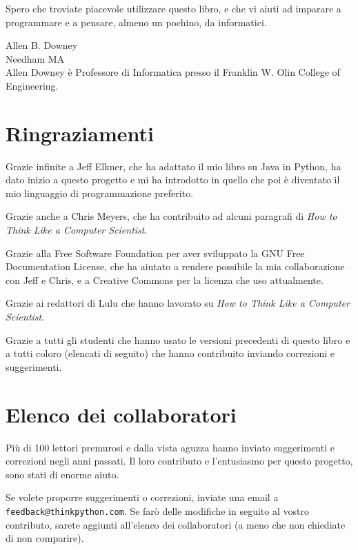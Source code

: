 \documentclass[10pt]{book}
\begin{document}
Spero che troviate piacevole utilizzare questo libro, e che vi aiuti ad imparare a programmare e a pensare, almeno un pochino, da informatici.


Allen B. Downey \\
Needham MA\\

Allen Downey è Professore di Informatica presso il Franklin W. Olin College of Engineering.


\section*{Ringraziamenti}

Grazie infinite a Jeff Elkner, che ha adattato il mio libro su Java in Python, ha dato inizio a questo progetto e mi ha introdotto in quello che poi è diventato il mio linguaggio di programmazione preferito. 

Grazie anche a Chris Meyers, che ha contribuito ad alcuni paragrafi di
{\em How to Think Like a Computer Scientist}.

Grazie alla Free Software Foundation per aver sviluppato la GNU Free Documentation License, che ha aiutato a rendere possibile la mia collaborazione con Jeff e Chris, e a Creative Commons per la licenza che uso attualmente.

Grazie ai redattori di Lulu che hanno lavorato su
{\em How to Think Like a Computer Scientist}.

Grazie a tutti gli studenti che hanno usato le versioni precedenti di questo libro e a tutti coloro (elencati di seguito) che hanno contribuito inviando correzioni e suggerimenti.


\section*{Elenco dei collaboratori}

Più di 100 lettori premurosi e dalla vista aguzza hanno inviato suggerimenti e correzioni negli anni passati. Il loro contributo e l'entusiasmo per questo progetto, sono stati di enorme aiuto.

Se volete proporre suggerimenti o correzioni, inviate una email a 
{\tt feedback@thinkpython.com}. Se farò delle modifiche in seguito al vostro contributo, sarete aggiunti all'elenco dei collaboratori (a meno che non chiediate di non comparire).
\end{document}
